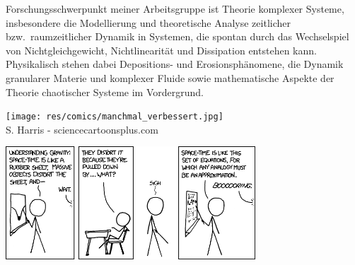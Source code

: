 \begin{multicols}{2}
Forschungsschwerpunkt meiner Arbeitsgruppe ist Theorie komplexer Systeme, insbesondere die Modellierung und theoretische Analyse zeitlicher bzw.\ raumzeitlicher Dynamik in Systemen, die spontan durch das Wechselspiel von Nichtgleichgewicht, Nichtlinearität und Dissipation entstehen kann. Physikalisch stehen dabei Depositions- und Erosionsphänomene, die Dynamik granularer Materie und komplexer Fluide sowie mathematische Aspekte der Theorie chaotischer Systeme im Vordergrund.

\begin{center}
\texttt{[image: res/comics/manchmal\_verbessert.jpg]}\\
{\footnotesize 
S. Harris - sciencecartoonsplus.com}
\end{center}
\end{multicols}

\medskip

\begin{center}
	\includegraphics[width=0.7\textwidth]{res/xkcd/895_teaching_physics.png}
\end{center}

\newpage

